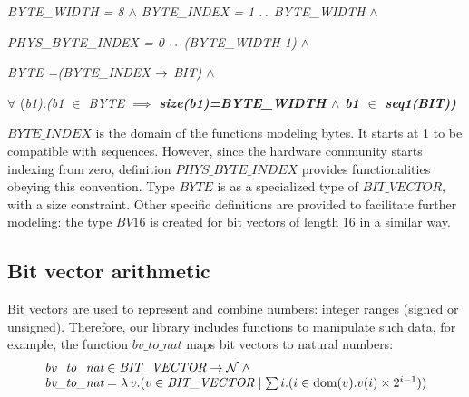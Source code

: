 \documentclass[a4paper]{llncs}
\begin{document}
\hspace*{0.0in}\it BYTE\_WIDTH \rm = 8 $\land$ \it BYTE\_INDEX \rm = 1 $\mathbin{\ldotp\ldotp}$ \rm  BYTE\_WIDTH\rm  \hspace*{0.03in} $\land$

\hspace*{0.0in}\it PHYS\_BYTE\_INDEX \rm = \rm 0 $\mathbin{\ldotp\ldotp}$ \rm (\it BYTE\_WIDTH\rm -\rm 1\rm )\hspace*{0.03in} $\land$

\hspace*{0.0in}\it BYTE \rm =\rm (\it BYTE\_INDEX  $\rightarrow$  \it BIT\rm )\hspace*{0.0in} $\land$  


\hspace*{0.0in}$\forall$ \rm (\it b1\rm )\rm .\rm (\it b1  $\in$  \it BYTE  $\implies$  \bf size\rm (\it b1\rm )\rm =\it BYTE\_WIDTH  $\land$  \it b1  $\in$  \bf seq1\rm (\it BIT\rm )\rm ) 



$\textit{BYTE\_INDEX}$ is the domain of the functions modeling
bytes. It starts at 1 to be compatible with sequences. However, since
the hardware community starts indexing from zero, definition
$\textit{PHYS\_BYTE\_INDEX}$ provides functionalities obeying this
convention. Type $\textit{BYTE}$ is as a specialized type of
$\textit{BIT\_VECTOR}$, with a size constraint. Other specific
definitions are provided to facilitate further modeling: the type
$\textit{BV16}$ is created for bit vectors of length 16 in a similar
way.

\subsection{Bit vector arithmetic}
\label{subsec:Types}
 

Bit vectors are used to represent and combine numbers: integer ranges
(signed or unsigned). Therefore, our library includes functions to
manipulate such data, for example, the function $\textit{bv\_to\_nat}$
maps bit vectors to natural numbers:
$$
\begin{array}{l}
\textit{bv\_to\_nat} \in \textit{BIT\_VECTOR} \fun \nat  \land \\
\textit{bv\_to\_nat} = \lambda v .  (v \in \textit{BIT\_VECTOR} \mid  \sum i . (i \in \dom(v) . v(i)
\times 2^{i-1}))
\end{array}
$$
\end{document}
